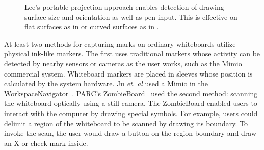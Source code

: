 \begin{figure}
\centering
{}

\caption{Lee's portable projection approach enables detection of
  drawing surface size and orientation as well as pen input. This is
  effective on flat surfaces as in  or
  curved surfaces as in .}

\label{fig:lee-display}
\end{figure}

At least two methods for capturing marks on ordinary whiteboards
utilize physical ink-like markers. The first uses traditional markers
whose activity can be detected by nearby sensors or cameras as the
user works, such as the Mimio commercial system. Whiteboard markers
are placed in sleeves whose position is calculated by the system
hardware.  Ju \textit{et. al} used a Mimio in the
WorkspaceNavigator~\cite{ju-navigator}.  PARC's
ZombieBoard~\cite{moran-collage-zombie,saund-zombie} used the second
method: scanning the whiteboard optically using a still camera. The
ZombieBoard enabled users to interact with the computer by drawing
special symbols. For example, users could delimit a region of the
whiteboard to be scanned by drawing its boundary. To invoke the scan,
the user would draw a button on the region boundary and draw an X or
check mark inside.

